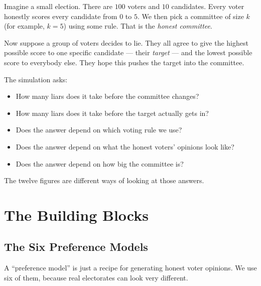 \documentclass[11pt,a4paper]{article}
\begin{document}
Imagine a small election. There are \(100\) voters and \(10\) candidates.
Every voter honestly scores every candidate from \(0\) to \(5\). We then pick a committee of size
\(k\) (for example, \(k = 5\)) using some rule. That is the \emph{honest
committee}.

Now suppose a group of voters decides to lie. They all agree to give the
highest possible score to one specific candidate --- their \emph{target} ---
and the lowest possible score to everybody else. They hope this pushes the
target into the committee.

The simulation asks:
\begin{itemize}
  \item How many liars does it take before the committee changes?
  \item How many liars does it take before the target actually gets in?
  \item Does the answer depend on which voting rule we use?
  \item Does the answer depend on what the honest voters' opinions look like?
  \item Does the answer depend on how big the committee is?
\end{itemize}

The twelve figures are different ways of looking at those answers.

\section{The Building Blocks}

\subsection{The Six Preference Models}

A ``preference model'' is just a recipe for generating honest voter opinions.
We use six of them, because real electorates can look very different.
\end{document}
